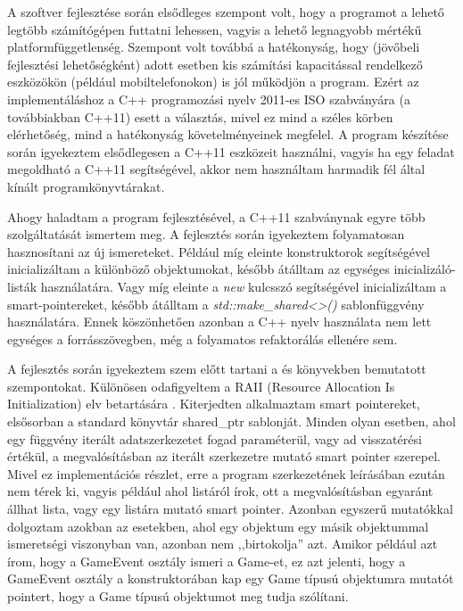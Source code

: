 \documentclass[12pt, twoside]{report}
\begin{document}
A szoftver fejlesztése során elsődleges szempont volt, hogy a programot a lehető legtöbb számítógépen futtatni lehessen, vagyis a lehető legnagyobb mértékű platformfüggetlenség. Szempont volt továbbá a hatékonyság, hogy (jövőbeli fejlesztési lehetőségként) adott esetben kis számítási kapacitással rendelkező eszközökön (például mobiltelefonokon) is jól működjön a program. Ezért az implementáláshoz a C++ programozási nyelv 2011-es ISO szabványára (a továbbiakban C++11) esett a választás, mivel ez mind a széles körben elérhetőség, mind a hatékonyság követelményeinek megfelel. A program készítése során igyekeztem elsődlegesen a C++11 eszközeit használni, vagyis ha egy feladat megoldható a C++11 segítségével, akkor nem használtam harmadik fél által kínált programkönyvtárakat.

Ahogy haladtam a program fejlesztésével, a C++11 szabványnak egyre több szol\-gál\-ta\-tá\-sát ismertem meg. A fejlesztés során igyekeztem folyamatosan hasznosítani az új ismereteket. Például míg eleinte konstruktorok segítségével inicializáltam a különböző objektumokat, később átálltam az egységes inicializáló-listák használatára. Vagy míg eleinte a \emph{new} kulcsszó segítségével inicializáltam a smart-pointereket, később átálltam a \emph{std::make\_shared\textless\textgreater()} sablonfüggvény használatára. Ennek köszönhetően azonban a C++ nyelv használata nem lett egységes a forrásszövegben, még a folyamatos refaktorálás ellenére sem.

A fejlesztés során igyekeztem szem előtt tartani a \cite{codingrules} és \cite{effective} könyvekben bemutatott szempontokat. Különösen odafigyeltem a RAII (Resource Allocation Is Initialization) elv betartására \cite{raii}. Kiterjedten alkalmaztam smart pointereket, elsősorban a standard könyvtár shared\_ptr sablonját. Minden olyan esetben, ahol egy függvény iterált adatszerkezetet fogad paraméterül, vagy ad visszatérési értékül, a megvalósításban az iterált szerkezetre mutató smart pointer szerepel. Mivel ez implementációs részlet, erre a program szerkezetének leírásában ezután nem térek ki, vagyis például ahol listáról írok, ott a megvalósításban egyaránt állhat lista, vagy egy listára mutató smart pointer. Azonban egyszerű mutatókkal dolgoztam azokban az esetekben, ahol egy objektum egy másik objektummal ismeretségi viszonyban van, azonban nem ,,birtokolja'' azt. Amikor például azt írom, hogy a GameEvent osztály ismeri a Game-et, ez azt jelenti, hogy a GameEvent osztály a konstruktorában kap egy Game típusú objektumra mutatót pointert, hogy a Game típusú objektumot meg tudja szólítani.
\end{document}
